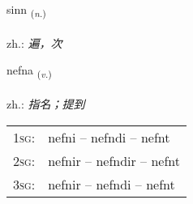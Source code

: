 \documentclass[frontgrid, backgrid]{flacards}\usepackage[]{graphicx}\usepackage[]{xcolor}
\begin{document}
\renewcommand{\blhead}{\vskip5pt {\small\bfseries\footnotesize Nafnorð | 名词 }}
\renewcommand{\bcfoot}{\vskip5pt \hspace{2pt}{\small\bfseries\footnotesize 1K}}


{sinn \small{\textsubscript{(\textit{n.})}} \\[1ex] %
\textphonetic{[sɪn]} \\
zh.: \emph{遍，次} \\  [2ex]
\renewcommand*{\arraystretch}{0.8}
}

\renewcommand{\flhead}{\vskip5pt \fboxsep=0pt {\small\bfseries\footnotesize Sagnorð | 动词}}
\renewcommand{\fcfoot}{\vskip5pt \fboxsep=0pt \hspace{2pt}{\small\bfseries\footnotesize 1K}}

\renewcommand{\blhead}{\vskip5pt {\small\bfseries\footnotesize Sagnorð | 动词 }}
\renewcommand{\bcfoot}{\vskip5pt \hspace{2pt}{\small\bfseries\footnotesize 1K}}


{nefna \small{\textsubscript{(\textit{v.})}} \\[1ex] %
\textphonetic{[nɛpna]} \\
zh.: \emph{指名；提到} \\  [2ex]
\renewcommand*{\arraystretch}{0.8}
\begin{tabular}{p{1cm}l}
\textsc{1sg}: & nefni -- nefndi -- nefnt \\ 
\textsc{2sg}: & nefnir -- nefndir -- nefnt \\ 
\textsc{3sg}: & nefnir -- nefndi -- nefnt \\ 
\end{tabular}
}

\renewcommand{\flhead}{\vskip5pt \fboxsep=0pt {\small\bfseries\footnotesize Nafnorð | 名词}}
\renewcommand{\fcfoot}{\vskip5pt \fboxsep=0pt \hspace{2pt}{\small\bfseries\footnotesize 1K}}
\end{document}
